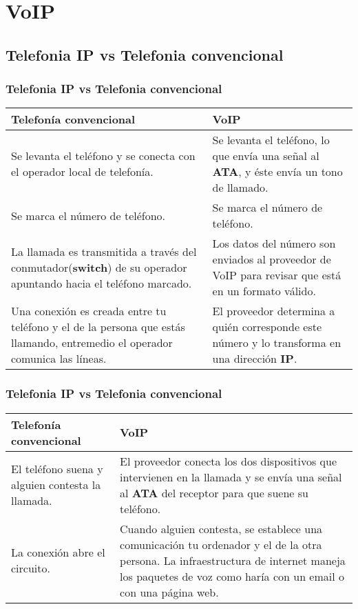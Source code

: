 \documentclass{beamer}
\begin{document}
\section{VoIP}
\subsection{Telefonia IP vs Telefonia convencional}
\begin{frame}
\frametitle{Telefonia IP vs Telefonia convencional}
		\begin{tabular}{|p{5.5cm}|p{5.5cm}|}
		\hline
		Telefonía convencional & VoIP \\
		\hline \hline
		Se levanta el teléfono y se conecta con el operador local de telefonía. & Se levanta el teléfono, lo que envía una señal al \textbf{ATA}, y éste envía un tono de llamado. \\
		\hline
		Se marca el número de teléfono. & Se marca el número de teléfono. \\
		\hline
		La llamada es transmitida a través del conmutador(\textbf{switch}) de su operador apuntando hacia el teléfono marcado. & Los datos del número son enviados al proveedor de VoIP para revisar que está en un formato válido. \\
		\hline
		Una conexión es creada entre tu teléfono y el de la persona que estás llamando, entremedio el operador comunica las líneas. & El proveedor determina a quién corresponde este número y lo transforma en una dirección \textbf{IP}. \\
		\hline
		\end{tabular}
\end{frame}
\begin{frame}
\frametitle{Telefonia IP vs Telefonia convencional}
	\begin{tabular}{|p{5.5cm}|p{5.5cm}|}
				\hline
		Telefonía convencional & VoIP \\
		\hline \hline
		El teléfono suena y alguien contesta la llamada. & El proveedor conecta los dos dispositivos que intervienen en la llamada y se envía una señal al \textbf{ATA} del receptor para que suene su teléfono. \\
		\hline
		La conexión abre el circuito. & Cuando alguien contesta, se establece una comunicación tu ordenador y el de la otra persona. La infraestructura de internet maneja los paquetes de voz como haría con un email o con una página web. \\
		\hline
	\end{tabular}
\end{frame}
\end{document}

